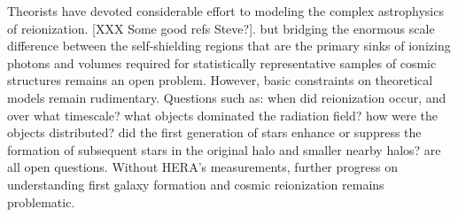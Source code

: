 \documentclass[preprint]{aastex}
\begin{document}
Theorists have devoted considerable effort to modeling the complex astrophysics of reionization. [XXX Some good refs Steve?].
but bridging the enormous scale difference between the self-shielding
regions that are the primary sinks of ionizing photons and volumes required for statistically
representative samples of cosmic structures remains an open problem.
However, basic constraints on theoretical models remain rudimentary. Questions such as:  when did reionization occur, and over what timescale?  what objects dominated the radiation field? how were the objects distributed? did the first generation of stars enhance or suppress the formation of subsequent stars in the original halo and smaller nearby halos? are all open questions. Without HERA's measurements, further progress on understanding first galaxy formation and cosmic reionization remains problematic. 

\end{document}

